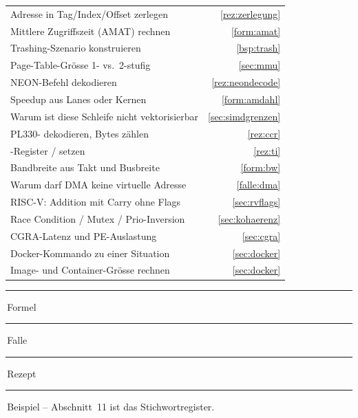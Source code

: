 
\begin{tcolorbox}[zfbox, colback=black!2, colframe=black!45,
  coltitle=white, colbacktitle=black!45, title={Wenn die Aufgabe lautet \dots}]
\begin{tabularx}{\linewidth}{@{}Xr@{}}
Adresse in Tag/Index/Offset zerlegen & \ref{rez:zerlegung} \\
Mittlere Zugriffszeit (AMAT) rechnen & \ref{form:amat} \\
Trashing-Szenario konstruieren & \ref{bsp:trash} \\
Page-Table-Grösse 1- vs.\ 2-stufig & \ref{sec:mmu} \\
NEON-Befehl dekodieren & \ref{rez:neondecode} \\
Speedup aus Lanes oder Kernen & \ref{form:amdahl} \\
Warum ist diese Schleife nicht vektorisierbar & \ref{sec:simdgrenzen} \\
PL330-\R{CCR} dekodieren, Bytes zählen & \ref{rez:ccr} \\
\R{TI}-Register / \R{SRC\_INC} setzen & \ref{rez:ti} \\
Bandbreite aus Takt und Busbreite & \ref{form:bw} \\
Warum darf DMA keine virtuelle Adresse & \ref{falle:dma} \\
RISC-V: Addition mit Carry ohne Flags & \ref{sec:rvflags} \\
Race Condition / Mutex / Prio-Inversion & \ref{sec:kohaerenz} \\
CGRA-Latenz und PE-Auslastung & \ref{sec:cgra} \\
Docker-Kommando zu einer Situation & \ref{sec:docker} \\
Image- und Container-Grösse rechnen & \ref{sec:docker} \\
\end{tabularx}
\vspace{2pt}
\textcolor{accent}{\rule{7pt}{7pt}}\,Formel \;
\textcolor{red!65}{\rule{7pt}{7pt}}\,Falle \;
\textcolor{green!40!black}{\rule{7pt}{7pt}}\,Rezept \;
\textcolor{black!55}{\rule{7pt}{7pt}}\,Beispiel \;
-- Abschnitt~11 ist das Stichwortregister.
\end{tcolorbox}
